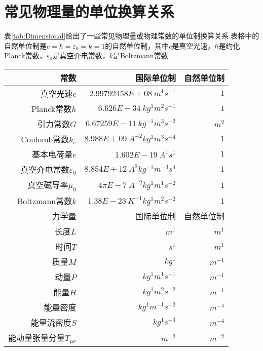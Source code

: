 \section{常见物理量的单位换算关系}\label{sec:Dimensional}
	表\ref{tab:Dimensional}给出了一些常见物理量或物理常数的单位制换算关系.表格中的自然单位制是$c=\hbar=\varepsilon_0=k=1$的自然单位制，其中$c$是真空光速，$\hbar$是约化Planck常数，$\varepsilon_0$是真空介电常数，$k$是Boltzmann常数.
	
	\begin{table}[!htbp]
		\centering
		\begin{tabular*}{\hsize}{@{}@{\extracolsep{\fill}}rrr@{}}
			\toprule
			常数							&				国际单位制					&	自然单位制	\\
			\midrule
			真空光速$c$							&	$2.99792458E+08\ m^{1}s^{-1}$			&	$1$							\\
			Planck常数$h$					&	$6.626E-34\ kg^{1}m^{2}s^{-1}$			&	$1$							\\
			引力常数$G$						&	$6.67259E-11\ kg^{-1}m^{3}s^{-2}$		&	$m^{2}$						\\
			Coulomb常数$k_e$				&	$8.988E+09\ A^{-2}kg^{1}m^{3}s^{-4}$	&	$1$							\\
			基本电荷量$e$					&	$1.602E-19\ A^{1}s^{1}$					&	$1$							\\
			真空介电常数$\varepsilon_0$		&	$8.854E+12\ A^{2}kg^{-1}m^{-3}s^{4}$	&	$1$							\\
			真空磁导率$\mu_0$				&	$4\pi E-7\ A^{-2}kg^{1}m^{1}s^{-2}$		&	$1$							\\
			Boltzmann常数$k$				&	$1.38 E-23\ K^{-1}kg^{1}m^{2}s^{-2}$	&	$1$							\\
			\midrule
			力学量							&				国际单位制					&	自然单位制	\\
			\midrule
			长度$L$							&	$m^{1}$									&	 $m^{1}$					\\
			时间$T$							&	$s^{1}$									&	 $m^{1}$					\\
			质量$M$							&	$kg^{1}$								&	 $m^{-1}$					\\
			动量$P$							&	$kg^{1}m^{1}s^{-1}$						&	 $m^{-1}$					\\
			能量$H$							&	$kg^{1}m^{2}s^{-2}$						&	$m^{-1}$					\\
			能量密度						&	$kg^{1}m^{-1}s^{-2}$					&	$m^{-4}$					\\
			能量流密度$S$					&	$kg^{1}s^{-3}$							&	$m^{-4}$					\\
			能动量张量分量$T_{\mu\nu}$		&	$m^{-2}$								&	$m^{-2}$					\\

\end{tabular*}
\end{table}
